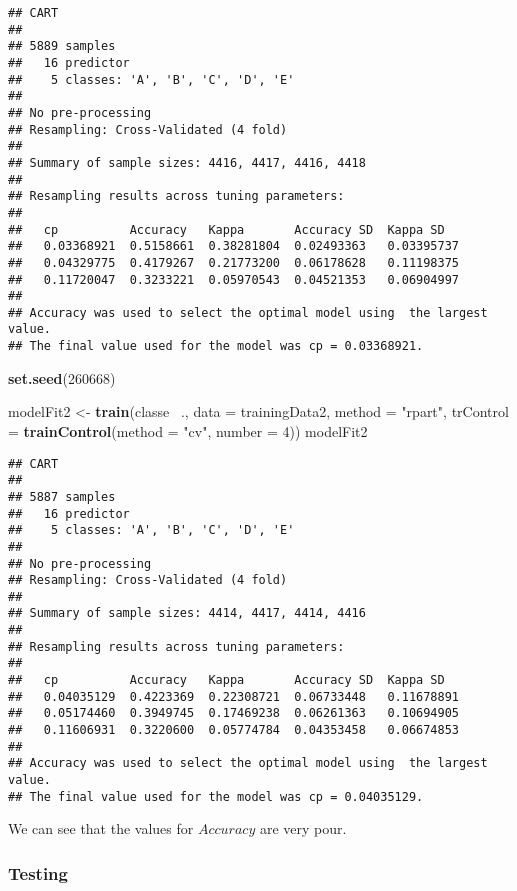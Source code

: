 \documentclass[]{article}
\newenvironment{Shaded}{\begin{snugshade}}{\end{snugshade}}
\newcommand{\KeywordTok}[1]{\textcolor[rgb]{0.13,0.29,0.53}{\textbf{{#1}}}}
\newcommand{\DataTypeTok}[1]{\textcolor[rgb]{0.13,0.29,0.53}{{#1}}}
\newcommand{\DecValTok}[1]{\textcolor[rgb]{0.00,0.00,0.81}{{#1}}}
\newcommand{\StringTok}[1]{\textcolor[rgb]{0.31,0.60,0.02}{{#1}}}
\newcommand{\NormalTok}[1]{{#1}}
\begin{document}
\begin{verbatim}
## CART 
## 
## 5889 samples
##   16 predictor
##    5 classes: 'A', 'B', 'C', 'D', 'E' 
## 
## No pre-processing
## Resampling: Cross-Validated (4 fold) 
## 
## Summary of sample sizes: 4416, 4417, 4416, 4418 
## 
## Resampling results across tuning parameters:
## 
##   cp          Accuracy   Kappa       Accuracy SD  Kappa SD  
##   0.03368921  0.5158661  0.38281804  0.02493363   0.03395737
##   0.04329775  0.4179267  0.21773200  0.06178628   0.11198375
##   0.11720047  0.3233221  0.05970543  0.04521353   0.06904997
## 
## Accuracy was used to select the optimal model using  the largest value.
## The final value used for the model was cp = 0.03368921.
\end{verbatim}

\begin{Shaded}
\begin{Highlighting}[]
\KeywordTok{set.seed}\NormalTok{(}\DecValTok{260668}\NormalTok{)}

\NormalTok{modelFit2 <-}\StringTok{ }\KeywordTok{train}\NormalTok{(classe ~., }\DataTypeTok{data =} \NormalTok{trainingData2,}
                  \DataTypeTok{method =} \StringTok{"rpart"}\NormalTok{,}
                  \DataTypeTok{trControl =} \KeywordTok{trainControl}\NormalTok{(}\DataTypeTok{method =} \StringTok{"cv"}\NormalTok{, }\DataTypeTok{number =} \DecValTok{4}\NormalTok{))}
\NormalTok{modelFit2}
\end{Highlighting}
\end{Shaded}

\begin{verbatim}
## CART 
## 
## 5887 samples
##   16 predictor
##    5 classes: 'A', 'B', 'C', 'D', 'E' 
## 
## No pre-processing
## Resampling: Cross-Validated (4 fold) 
## 
## Summary of sample sizes: 4414, 4417, 4414, 4416 
## 
## Resampling results across tuning parameters:
## 
##   cp          Accuracy   Kappa       Accuracy SD  Kappa SD  
##   0.04035129  0.4223369  0.22308721  0.06733448   0.11678891
##   0.05174460  0.3949745  0.17469238  0.06261363   0.10694905
##   0.11606931  0.3220600  0.05774784  0.04353458   0.06674853
## 
## Accuracy was used to select the optimal model using  the largest value.
## The final value used for the model was cp = 0.04035129.
\end{verbatim}

We can see that the values for \(Accuracy\) are very pour.

\subsubsection{Testing}\label{testing}
\end{document}
